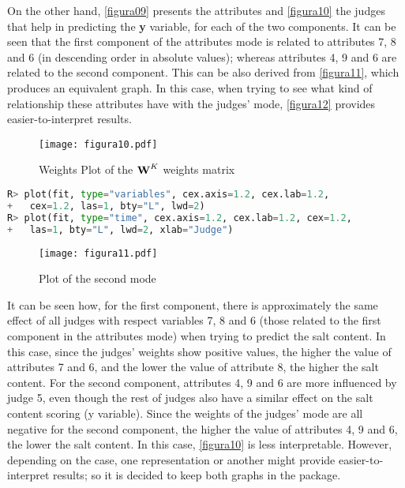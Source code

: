 On the other hand, \autoref{figura09} presents the attributes and \autoref{figura10} the judges that help in predicting the \textbf{y} variable, for each of the two components. It can be seen that the first component of the attributes mode is related to attributes 7, 8 and 6 (in descending order in absolute values); whereas attributes 4, 9 and 6 are related to the second component. This can be also derived from \autoref{figura11}, which produces an equivalent graph. In this case, when trying to see what kind of relationship these attributes have with the judges’ mode, \autoref{figura12} provides easier-to-interpret results.

\begin{figure}[!ht]
\centering
\texttt{[image: figura10.pdf]}
\caption{Weights Plot of the $\textbf{\text{W}}^{K}$ weights matrix}
\label{figura10}
\end{figure}

\vspace{15pt}
\begin{lstlisting}[basicstyle=\small, language=Python]
R> plot(fit, type="variables", cex.axis=1.2, cex.lab=1.2, 
+   cex=1.2, las=1, bty="L", lwd=2)
R> plot(fit, type="time", cex.axis=1.2, cex.lab=1.2, cex=1.2, 
+   las=1, bty="L", lwd=2, xlab="Judge")
\end{lstlisting}

\begin{figure}[!ht]
	\centering
\texttt{[image: figura11.pdf]}
\caption{Plot of the second mode}
\label{figura11}
\end{figure}

It can be seen how, for the first component, there is approximately the same effect of all judges with respect variables 7, 8 and 6 (those related to the first component in the attributes mode) when trying to predict the salt content. In this case, since the judges’ weights show positive values, the higher the value of attributes 7 and 6, and the lower the value of attribute 8, the higher the salt content. For the second component, attributes 4, 9 and 6 are more influenced by judge 5, even though the rest of judges also have a similar effect on the salt content scoring (y variable). Since the weights of the judges’ mode are all negative for the second component, the higher the value of attributes 4, 9 and 6, the lower the salt content. In this case, \autoref{figura10} is less interpretable. However, depending on the case, one representation or another might provide easier-to-interpret results; so it is decided to keep both graphs in the package.


